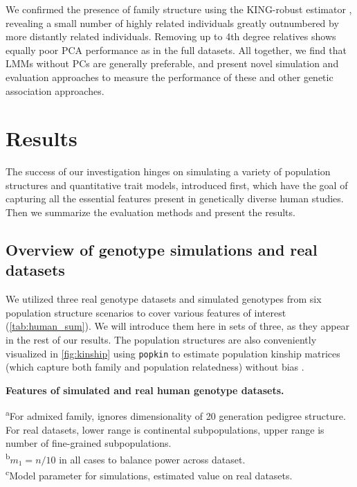 \documentclass[11pt]{article}
\begin{document}
We confirmed the presence of family structure using the KING-robust estimator \citep{manichaikul_robust_2010}, revealing a small number of highly related individuals greatly outnumbered by more distantly related individuals.
Removing up to 4th degree relatives shows equally poor PCA performance as in the full datasets.
All together, we find that LMMs without PCs are generally preferable, and present novel simulation and evaluation approaches to measure the performance of these and other genetic association approaches.

\section{Results}

The success of our investigation hinges on simulating a variety of population structures and quantitative trait models, introduced first, which have the goal of capturing all the essential features present in genetically diverse human studies.
Then we summarize the evaluation methods and present the results.

\subsection{Overview of genotype simulations and real datasets}

We utilized three real genotype datasets and simulated genotypes from six population structure scenarios to cover various features of interest (\cref{tab:human_sum}).
We will introduce them here in sets of three, as they appear in the rest of our results.
The population structures are also conveniently visualized in \cref{fig:kinship} using \texttt{popkin} to estimate population kinship matrices (which capture both family and population relatedness) without bias \citep{ochoa_estimating_2021}.

\begin{table}[hb!]
  \centering
  \footnotesize
  \caption{
    \textbf{Features of simulated and real human genotype datasets.}
  }
  \label{tab:human_sum}
  \begin{flushleft} 
    \textsuperscript{a}For admixed family, ignores dimensionality of 20 generation pedigree structure.
    For real datasets, lower range is continental subpopulations, upper range is number of fine-grained subpopulations.\\
    \textsuperscript{b}$m_1 = n / 10$ in all cases to balance power across dataset.\\
    \textsuperscript{c}Model parameter for simulations, estimated value on real datasets.
  \end{flushleft}
\end{table}
\end{document}
